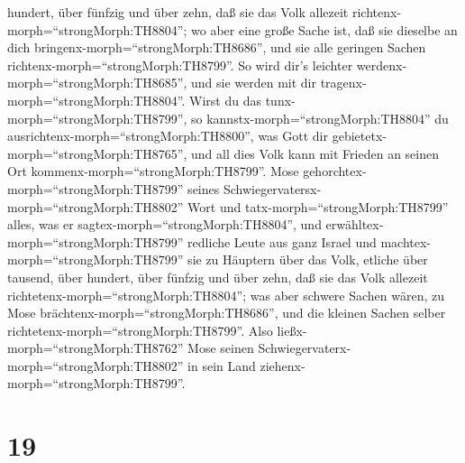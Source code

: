 hundert, über fünfzig und über zehn,  daß sie das Volk
allezeit richtenx-morph=``strongMorph:TH8804''; wo aber eine große Sache
ist, daß sie dieselbe an dich bringenx-morph=``strongMorph:TH8686'', und
sie alle geringen Sachen richtenx-morph=``strongMorph:TH8799''. So wird
dir's leichter werdenx-morph=``strongMorph:TH8685'', und sie werden mit
dir tragenx-morph=``strongMorph:TH8804''.  Wirst du das
tunx-morph=``strongMorph:TH8799'', so
kannstx-morph=``strongMorph:TH8804'' du
ausrichtenx-morph=``strongMorph:TH8800'', was Gott dir
gebietetx-morph=``strongMorph:TH8765'', und all dies Volk kann mit
Frieden an seinen Ort kommenx-morph=``strongMorph:TH8799''.
 Mose gehorchtex-morph=``strongMorph:TH8799'' seines
Schwiegervatersx-morph=``strongMorph:TH8802'' Wort und
tatx-morph=``strongMorph:TH8799'' alles, was er
sagtex-morph=``strongMorph:TH8804'',  und
erwähltex-morph=``strongMorph:TH8799'' redliche Leute aus ganz Israel
und machtex-morph=``strongMorph:TH8799'' sie zu Häuptern über das Volk,
etliche über tausend, über hundert, über fünfzig und über zehn,
 daß sie das Volk allezeit
richtetenx-morph=``strongMorph:TH8804''; was aber schwere Sachen wären,
zu Mose brächtenx-morph=``strongMorph:TH8686'', und die kleinen Sachen
selber richtetenx-morph=``strongMorph:TH8799''.  Also
ließx-morph=``strongMorph:TH8762'' Mose seinen
Schwiegervaterx-morph=``strongMorph:TH8802'' in sein Land
ziehenx-morph=``strongMorph:TH8799''.

\hypertarget{section-18}{%
\section{19}\label{section-18}}

